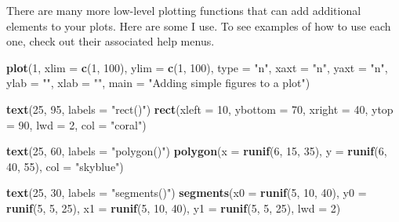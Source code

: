 \documentclass[]{book}
\newenvironment{Shaded}{\begin{snugshade}}{\end{snugshade}}
\newcommand{\KeywordTok}[1]{\textcolor[rgb]{0.13,0.29,0.53}{\textbf{#1}}}
\newcommand{\DataTypeTok}[1]{\textcolor[rgb]{0.13,0.29,0.53}{#1}}
\newcommand{\DecValTok}[1]{\textcolor[rgb]{0.00,0.00,0.81}{#1}}
\newcommand{\StringTok}[1]{\textcolor[rgb]{0.31,0.60,0.02}{#1}}
\newcommand{\NormalTok}[1]{#1}
\theoremstyle{definition}
\theoremstyle{definition}
\theoremstyle{remark}
\begin{document}
There are many more low-level plotting functions that can add additional
elements to your plots. Here are some I use. To see examples of how to
use each one, check out their associated help menus.

\begin{Shaded}
\begin{Highlighting}[]
\KeywordTok{plot}\NormalTok{(}\DecValTok{1}\NormalTok{, }\DataTypeTok{xlim =} \KeywordTok{c}\NormalTok{(}\DecValTok{1}\NormalTok{, }\DecValTok{100}\NormalTok{), }\DataTypeTok{ylim =} \KeywordTok{c}\NormalTok{(}\DecValTok{1}\NormalTok{, }\DecValTok{100}\NormalTok{),}
     \DataTypeTok{type =} \StringTok{"n"}\NormalTok{, }\DataTypeTok{xaxt =} \StringTok{"n"}\NormalTok{, }\DataTypeTok{yaxt =} \StringTok{"n"}\NormalTok{,}
     \DataTypeTok{ylab =} \StringTok{""}\NormalTok{, }\DataTypeTok{xlab =} \StringTok{""}\NormalTok{, }\DataTypeTok{main =} \StringTok{"Adding simple figures to a plot"}\NormalTok{)}

\KeywordTok{text}\NormalTok{(}\DecValTok{25}\NormalTok{, }\DecValTok{95}\NormalTok{, }\DataTypeTok{labels =} \StringTok{"rect()"}\NormalTok{)}
\KeywordTok{rect}\NormalTok{(}\DataTypeTok{xleft =} \DecValTok{10}\NormalTok{, }\DataTypeTok{ybottom =} \DecValTok{70}\NormalTok{,}
     \DataTypeTok{xright =} \DecValTok{40}\NormalTok{, }\DataTypeTok{ytop =} \DecValTok{90}\NormalTok{, }\DataTypeTok{lwd =} \DecValTok{2}\NormalTok{, }\DataTypeTok{col =} \StringTok{"coral"}\NormalTok{)}

\KeywordTok{text}\NormalTok{(}\DecValTok{25}\NormalTok{, }\DecValTok{60}\NormalTok{, }\DataTypeTok{labels =} \StringTok{"polygon()"}\NormalTok{)}
\KeywordTok{polygon}\NormalTok{(}\DataTypeTok{x =} \KeywordTok{runif}\NormalTok{(}\DecValTok{6}\NormalTok{, }\DecValTok{15}\NormalTok{, }\DecValTok{35}\NormalTok{),}
        \DataTypeTok{y =} \KeywordTok{runif}\NormalTok{(}\DecValTok{6}\NormalTok{, }\DecValTok{40}\NormalTok{, }\DecValTok{55}\NormalTok{),}
        \DataTypeTok{col =} \StringTok{"skyblue"}\NormalTok{)}

\KeywordTok{text}\NormalTok{(}\DecValTok{25}\NormalTok{, }\DecValTok{30}\NormalTok{, }\DataTypeTok{labels =} \StringTok{"segments()"}\NormalTok{)}
\KeywordTok{segments}\NormalTok{(}\DataTypeTok{x0 =} \KeywordTok{runif}\NormalTok{(}\DecValTok{5}\NormalTok{, }\DecValTok{10}\NormalTok{, }\DecValTok{40}\NormalTok{),}
         \DataTypeTok{y0 =} \KeywordTok{runif}\NormalTok{(}\DecValTok{5}\NormalTok{, }\DecValTok{5}\NormalTok{, }\DecValTok{25}\NormalTok{),}
         \DataTypeTok{x1 =} \KeywordTok{runif}\NormalTok{(}\DecValTok{5}\NormalTok{, }\DecValTok{10}\NormalTok{, }\DecValTok{40}\NormalTok{),}
         \DataTypeTok{y1 =} \KeywordTok{runif}\NormalTok{(}\DecValTok{5}\NormalTok{, }\DecValTok{5}\NormalTok{, }\DecValTok{25}\NormalTok{), }
         \DataTypeTok{lwd =} \DecValTok{2}\NormalTok{)}


\end{Highlighting}
\end{Shaded}
\end{document}
